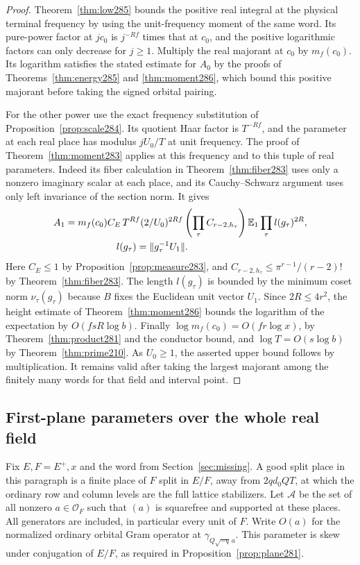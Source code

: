 \documentclass[a4paper,11pt]{article}
\theoremstyle{definition}
\theoremstyle{remark}
\numberwithin{equation}{section}
\begin{document}
\begin{proof}
Theorem~\ref{thm:low285} bounds the positive real integral
at the physical terminal frequency by using the unit-frequency
moment of the same word. Its pure-power factor at \(j c_0\)
is \(j^{-Rf}\) times that at \(c_0\), and the positive
logarithmic factors can only decrease for \(j\ge1\).
Multiply the real majorant at \(c_0\) by \(m_f(c_0)\).
Its logarithm satisfies the stated estimate for \(A_0\) by
the proofs of Theorems~\ref{thm:energy285} and
\ref{thm:moment286}, which bound this positive majorant
before taking the signed orbital pairing.

For the other power use the exact frequency substitution
of Proposition~\ref{prop:scale284}. Its quotient Haar
factor is \(T^{-Rf}\), and the parameter at each real place
has modulus \(jU_0/T\) at unit frequency. The proof of
Theorem~\ref{thm:moment283} applies at this frequency and
to this tuple of real parameters. Indeed its fiber calculation
in Theorem~\ref{thm:fiber283} uses only a nonzero imaginary
scalar at each place, and its Cauchy--Schwarz argument uses
only left invariance of the section norm. It gives
\[
 \begin{split}
 A_1={}&m_f(c_0) C_E\,T^{Rf}(2/U_0)^{2Rf}
       \left(\prod_\tau C_{r-2,h_\tau}\right)
       \mathbb E_1\prod_\tau l(g_\tau)^{2R},\\
 &\hspace{14mm}l(g_\tau)=\|g_\tau^{-1}U_1\|.
 \end{split}
\]
Here \(C_E\le1\) by Proposition~\ref{prop:measure283}, and
\(C_{r-2,h_\tau}\le\pi^{r-1}/(r-2)!\) by
Theorem~\ref{thm:fiber283}. The length \(l(g_\tau)\) is
bounded by the minimum coset norm \(\nu_\tau(g_\tau)\)
because \(B\) fixes the Euclidean unit vector \(U_1\).
Since \(2R\le4r^2\), the height estimate of
Theorem~\ref{thm:moment286} bounds the logarithm of the
expectation by \(O(fsR\log b)\). Finally
\(\log m_f(c_0)=O(fr\log x)\), by
Theorem~\ref{thm:product281} and the conductor bound,
and \(\log T=O(s\log b)\) by Theorem~\ref{thm:prime210}.
As \(U_0\ge1\), the asserted upper bound follows by
multiplication. It remains valid after taking the largest
majorant among the finitely many words for that field and
interval point.
\end{proof}

\subsection{First-plane parameters over the whole real field}\label{nav:I-68}
Fix \(E,F=E^+,x\) and the word from Section~\ref{sec:missing}. A good
split place in this paragraph is a finite place of \(F\)
split in \(E/F\), away from \(2q d_0 Q T\), at which the
ordinary row and column levels are the full lattice
stabilizers. Let \(\mathcal A\) be the set of all nonzero
\(a\in\mathcal O_F\) such that \((a)\) is squarefree and
supported at these places. All generators are included,
in particular every unit of \(F\). Write \(O(a)\) for
the normalized ordinary orbital Gram operator at
\(\gamma_{Q\sqrt{-q}\,a}\). This parameter is skew under
conjugation of \(E/F\), as required in
Proposition~\ref{prop:plane281}.
\end{document}
